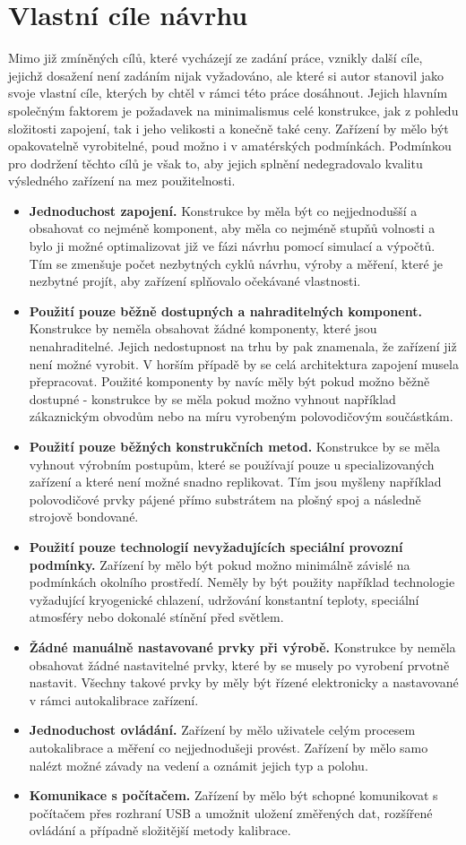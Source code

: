 \section{Vlastní cíle návrhu}
Mimo již zmíněných cílů, které vycházejí ze zadání práce, vznikly další cíle, jejichž dosažení není zadáním nijak vyžadováno, ale které si autor stanovil jako svoje vlastní cíle, kterých by chtěl v rámci této práce dosáhnout. Jejich hlavním společným faktorem je požadavek na minimalismus celé konstrukce, jak z pohledu složitosti zapojení, tak i jeho velikosti a konečně také ceny. Zařízení by mělo být opakovatelně vyrobitelné, poud možno i v amatérských podmínkách. Podmínkou pro dodržení těchto cílů je však to, aby jejich splnění nedegradovalo kvalitu výsledného zařízení na mez použitelnosti.
\begin{itemize}
\item \textbf{Jednoduchost zapojení.} Konstrukce by měla být co nejjednodušší a obsahovat co nejméně komponent, aby měla co nejméně stupňů volnosti a bylo ji možné optimalizovat již ve fázi návrhu pomocí simulací a výpočtů. Tím se zmenšuje počet nezbytných cyklů návrhu, výroby a měření, které je nezbytné projít, aby zařízení splňovalo očekávané vlastnosti.
\item \textbf{Použití pouze běžně dostupných a nahraditelných komponent.} Konstrukce by neměla obsahovat žádné komponenty, které jsou nenahraditelné. Jejich nedostupnost na trhu by pak znamenala, že zařízení již není možné vyrobit. V horším případě by se celá architektura zapojení musela přepracovat. Použité komponenty by navíc měly být pokud možno běžně dostupné - konstrukce by se měla pokud možno vyhnout například zákaznickým obvodům nebo na míru vyrobeným polovodičovým součástkám.
\item \textbf{Použití pouze běžných konstrukčních metod.} Konstrukce by se měla vyhnout výrobním postupům, které se používají pouze u specializovaných zařízení a které není možné snadno replikovat. Tím jsou myšleny například polovodičové prvky pájené přímo substrátem na plošný spoj a následně strojově bondované.
\item \textbf{Použití pouze technologií nevyžadujících speciální provozní podmínky.} Zařízení by mělo být pokud možno minimálně závislé na podmínkách okolního prostředí. Neměly by být použity například technologie vyžadující kryogenické chlazení, udržování konstantní teploty, speciální atmosféry nebo dokonalé stínění před světlem.
\item \textbf{Žádné manuálně nastavované prvky při výrobě.} Konstrukce by neměla obsahovat žádné nastavitelné prvky, které by se musely po vyrobení prvotně nastavit. Všechny takové prvky by měly být řízené elektronicky a nastavované v rámci autokalibrace zařízení.
\item \textbf{Jednoduchost ovládání.} Zařízení by mělo uživatele celým procesem autokalibrace a měření co nejjednodušeji provést. Zařízení by mělo samo nalézt možné závady na vedení a oznámit jejich typ a polohu.
\item \textbf{Komunikace s počítačem.} Zařízení by mělo být schopné komunikovat s počítačem přes rozhraní \acrfull{USB} a umožnit uložení změřených dat, rozšířené ovládání a případně složitější metody kalibrace.
\end{itemize}
